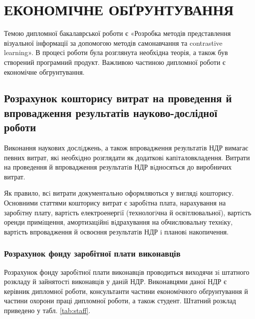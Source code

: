 \section{ЕКОНОМІЧНЕ ОБҐРУНТУВАННЯ}

Темою дипломної бакалаврської роботи є «Розробка методів представлення візуальної інформації за допомогою методів самонавчання та contrastive learning». В процесі роботи була розглянута необхідна теорія, а також був створений програмний продукт. Важливою частиною дипломної роботи є економічне обгрунтування.

\subsection{Розрахунок кошторису витрат на проведення й впровадження результатів науково-дослідної роботи}
Виконання наукових дослiджень, а також впровадження результатiв НДР вимагає певних витрат, якi необхiдно розглядати як додатковi капiталовкладення. Витрати на проведення й впровадження результатiв НДР вiдносяться до виробничих витрат. 

Як правило, всi витрати документально оформляються у виглядi кошторису. Основними статтями кошторису витрат є заробiтна плата, нарахування на заробiтну плату, вартiсть електроенергiї (технологiчна й освiтлювальної), вартiсть оренди примiщення, амортизацiйнi вiдрахування на обчислювальну технiку, вартiсть впровадження й освоєння результатiв НДР i плановi накопичення.

\subsubsection{Розрахунок фонду заробітної плати виконавців}
Розрахунок фонду заробiтної плати виконавцiв проводиться виходячи зi штатного розкладу й зайнятостi виконавцiв у данiй НДР.
Виконавцями даної НДР є керівник дипломної роботи, консультанти частини економічного обґрунтування й частини охорони праці дипломної роботи, а також студент. Штатний розклад приведено у табл. \ref{tab:staff}.

